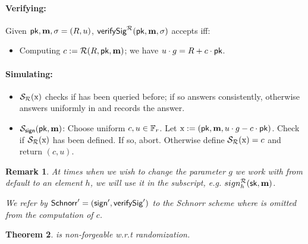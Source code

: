 \documentclass[11pt]{article}
\numberwithin{equation}{section} %
\numberwithin{figure}{section} %
\newtheorem{thm}{Theorem}[section]
\newtheorem{remark}[thm]{Remark}
\begin{document}
\paragraph{Verifying:}
 Given $\mathsf{pk},\mathbf m,\sigma=(R,u)$, $\mathsf{verifySig}^{\mathcal R}(\mathsf{pk},\mathbf m,\sigma)$ 
 accepts iff:

\begin{itemize}
 \item Computing $c:= \mathcal R(R,\mathsf{pk},\mathbf m)$; we have $u\cdot g = R+c\cdot \mathsf{pk}$.
\end{itemize}
\paragraph{Simulating:}
\begin{itemize}
\item $ {\mathcal S}_{\mathcal R}(\mathrm{x})$ checks if \str has been queried before; if so answers consistently, otherwise answers uniformly in \F and records the answer. 
 \item $ {\mathcal S}_{\mathsf{sign}}(\mathsf{pk},\mathbf m)$: Choose uniform $c,u \in {\mathbb F}_r$.
 Let $\mathrm{x} := (\mathsf{pk},\mathbf m, u\cdot g - c\cdot \mathsf{pk})$.
 Check if $ {\mathcal S}_{\mathcal R}(\mathrm{x})$ has been defined.
 If so, abort.  Otherwise define $ {\mathcal S}_{\mathcal R}(\mathrm{x})=c$ and return $(c,u)$.
\end{itemize}
\begin{remark}
 At times when we wish to change the parameter $g$ we work with from default to an element $h$,
 we will use it in the subscript, e.g. $sign_h^{\mathcal R}(\mathsf{sk},\mathbf m)$.
 
 We refer by $\mathsf{Schnorr}' = (\mathsf{sign}',\mathsf{verifySig}')$ to the Schnorr scheme where \pk is omitted from the computation of $c$.
\end{remark}
\begin{thm}\label{thm:schnorr-nf}
\schnorr is non-forgeable w.r.t randomization.
\end{thm}
\end{document}

